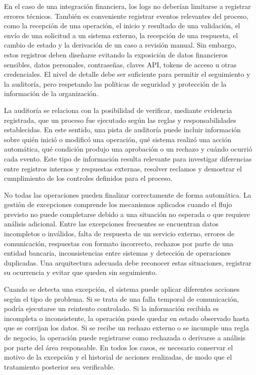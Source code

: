 En el caso de una integración financiera, los logs no deberían limitarse a registrar errores técnicos. También es conveniente registrar eventos relevantes del proceso, como la recepción de una operación, el inicio y resultado de una validación, el envío de una solicitud a un sistema externo, la recepción de una respuesta, el cambio de estado y la derivación de un caso a revisión manual. Sin embargo, estos registros deben diseñarse evitando la exposición de datos financieros sensibles, datos personales, contraseñas, claves API, tokens de acceso u otras credenciales. El nivel de detalle debe ser suficiente para permitir el seguimiento y la auditoría, pero respetando las políticas de seguridad y protección de la información de la organización.

La auditoría se relaciona con la posibilidad de verificar, mediante evidencia registrada, que un proceso fue ejecutado según las reglas y responsabilidades establecidas. En este sentido, una pista de auditoría puede incluir información sobre quién inició o modificó una operación, qué sistema realizó una acción automática, qué condición produjo una aprobación o un rechazo y cuándo ocurrió cada evento. Este tipo de información resulta relevante para investigar diferencias entre registros internos y respuestas externas, resolver reclamos y demostrar el cumplimiento de los controles definidos para el proceso.

No todas las operaciones pueden finalizar correctamente de forma automática. La gestión de excepciones comprende los mecanismos aplicados cuando el flujo previsto no puede completarse debido a una situación no esperada o que requiere análisis adicional. Entre las excepciones frecuentes se encuentran datos incompletos o inválidos, falta de respuesta de un servicio externo, errores de comunicación, respuestas con formato incorrecto, rechazos por parte de una entidad bancaria, inconsistencias entre sistemas y detección de operaciones duplicadas. Una arquitectura adecuada debe reconocer estas situaciones, registrar su ocurrencia y evitar que queden sin seguimiento.

Cuando se detecta una excepción, el sistema puede aplicar diferentes acciones según el tipo de problema. Si se trata de una falla temporal de comunicación, podría ejecutarse un reintento controlado. Si la información recibida es incompleta o inconsistente, la operación puede quedar en estado observado hasta que se corrijan los datos. Si se recibe un rechazo externo o se incumple una regla de negocio, la operación puede registrarse como rechazada o derivarse a análisis por parte del área responsable. En todos los casos, es necesario conservar el motivo de la excepción y el historial de acciones realizadas, de modo que el tratamiento posterior sea verificable.

